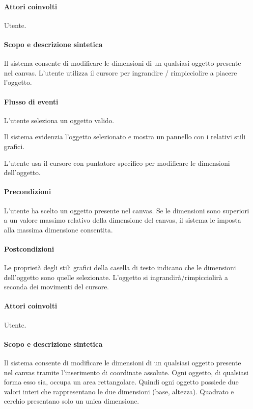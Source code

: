\paragraph{Attori coinvolti} Utente.
\paragraph{Scopo e descrizione sintetica}  Il sistema consente di modificare le dimensioni  di un qualsiasi oggetto presente nel canvas.  L'utente utilizza il cursore per ingrandire / rimpicciolire a piacere l'oggetto.
\paragraph{Flusso di eventi}
\begin{elenconumerato}[\textbf{}]{\subsubsecindent}
\item  L'utente seleziona un oggetto valido.
\item  Il sistema evidenzia l'oggetto selezionato e mostra un pannello con i relativi stili grafici.
\item  L'utente usa il cursore con puntatore specifico per modificare le dimensioni dell'oggetto.
\end{elenconumerato}
\paragraph{Precondizioni} L'utente ha scelto un oggetto presente nel canvas. Se le dimensioni sono superiori a un valore massimo relativo della dimensione del canvas, il sistema le imposta alla massima dimensione consentita.
\paragraph{Postcondizioni} Le propriet\`a  degli stili grafici della casella di testo indicano che le dimensioni dell'oggetto sono quelle selezionate. L'oggetto si ingrandir\` a/rimpicciolir\`a  a seconda dei movimenti del cursore.


\paragraph{Attori coinvolti} Utente.
\paragraph{Scopo e descrizione sintetica} Il sistema consente di modificare le dimensioni  di un qualsiasi oggetto presente nel canvas tramite l'inserimento di coordinate assolute.  Ogni oggetto, di qualsiasi forma esso sia, occupa un area rettangolare. Quindi ogni oggetto possiede due valori interi che rappresentano le due dimensioni (base, altezza). Quadrato e cerchio presentano solo un unica dimensione.
